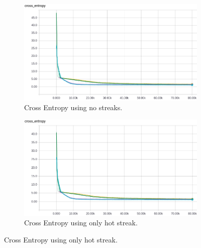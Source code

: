 \documentclass{article} %
\begin{document}
\begin{figure}[!htb]
  \begin{subfigure}{0.5\textwidth}
    \includegraphics[width=\linewidth]{plots/model1/wteam_onehot/streak-/crossentropy.png}
    \caption{Cross Entropy using no streaks.}\label{fig:wteam-onehot--crossentropy}
  \end{subfigure}
  \begin{subfigure}{0.5\textwidth}
    \includegraphics[width=\linewidth]{plots/model1/wteam_onehot/streak-h/crossentropy.png}
    \caption{Cross Entropy using only hot streak.}\label{fig:wteam-onehot-h-crossentropy}
  \end{subfigure}



\end{figure}
\end{document}
